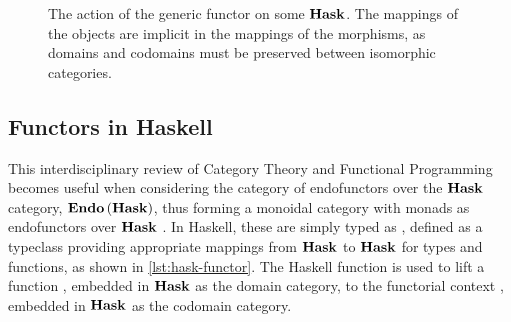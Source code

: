 \begin{figure}[ht]
        \vspace{\belowcaptionskip}
        \caption{The action of the generic functor  on some
                $\operatorname{\mathbf{Hask}}$. The mappings of the objects are implicit in the
                mappings of the morphisms, as domains and codomains must be
                preserved between isomorphic categories.}
        \label{fig:functor-general-fmap}
\end{figure}

\subsection{Functors in Haskell}

This interdisciplinary review of Category Theory and Functional Programming
becomes useful when considering the category of endofunctors over the $\operatorname{\mathbf{Hask}}$
category, $\operatorname{\mathbf{Endo}}{(\operatorname{\mathbf{Hask}})}$, thus forming a monoidal category with monads
as endofunctors over $\operatorname{\mathbf{Hask}}$ \autocite{Milewski:2019}. In Haskell, these are
simply typed as , defined as a typeclass providing
appropriate mappings from $\operatorname{\mathbf{Hask}}$ to $\operatorname{\mathbf{Hask}}$ for types and functions, as
shown in \autoref{lst:hask-functor}. The Haskell function  is
used to lift a function , embedded in $\operatorname{\mathbf{Hask}}$ as the domain
category, to the functorial context , embedded in
$\operatorname{\mathbf{Hask}}$ as the codomain category.

